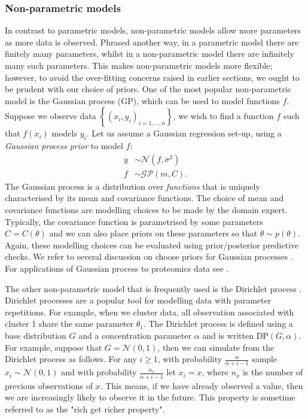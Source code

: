 \documentclass[12pt,english, journal=jpr, layout=twocolumn]{article}
\begin{document}
\subsubsection{Non-parametric models}
In contrast to parametric models, non-parametric models allow more parameters as more data is observed. Phrased another way, in a parametric model there are finitely many parameters, whilst in a non-parametric model there are infinitely many such parameters. This makes non-parametric models more flexible; however, to avoid the over-fitting concerns raised in earlier sections, we ought to be prudent with our choice of priors. One of the most popular non-parametric model is the Gaussian process (GP), which can be used to model functions $f$. Suppose we observe data $\left\{(x_i,y_i)_{i = 1,...,n}\right\}$, we wish to find a function $f$ such that $f(x_i)$ models $y_i$. Let us assume a Gaussian regression set-up, using a \textit{Gaussian process prior} to model $f$:
\begin{equation}
\begin{split}
y &\sim \mathcal{N}(f, \sigma^2)\\
f &\sim \mathcal{GP}(m, C).
\end{split}
\end{equation}
The Gaussian process is a distribution over \textit{functions} that is uniquely characterised by its mean and covariance functions. The choice of mean and covariance functions are modelling choices to be made by the domain expert. Typically, the covariance function is parametrised by some parameters $C = C(\theta)$ and we can also place priors on these parameters so that $\theta \sim p(\theta)$. Again, these modelling choices can be evaluated using prior/posterior predictive checks. We refer to several discussion on choose priors for Gaussian processes \citep{Berger::2001,Paulo::2005, De::2007, Van::2009, Fuglstad::2019}. For applications of Gaussian process to proteomics data see \citet{Maboudi::2017,Crook::2019b, Shin::2020, Fang::2021}.

The other non-parametric model that is frequently used is the Dirichlet process \citep{Ferguson::1973, Antoniak::1974}. Dirichlet processes are a popular tool for modelling data with parameter repetitions. For example, when we cluster data, all observation associated with cluster 1 share the same parameter $\theta_1$. The Dirichlet process is defined using a base distribution $G$ and a concentration parameter $\alpha$ and is written $\text{DP}(G, \alpha)$. For example, suppose that $G = \mathcal{N}(0, 1)$, then we can simulate from the Dirichlet process as follows. For any $i \geq 1$, with probability $\frac{\alpha}{\alpha + i - 1}$ sample $x_i \sim \mathcal{N}(0, 1)$ and with probability $\frac{n_x}{\alpha + i - 1}$  let $x_i = x$, where $n_x$ is the number of previous observations of $x$. This means, if we have already observed a value, then we are increasingly likely to observe it in the future. This property is sometime referred to as the "rich get richer property".
\end{document}
